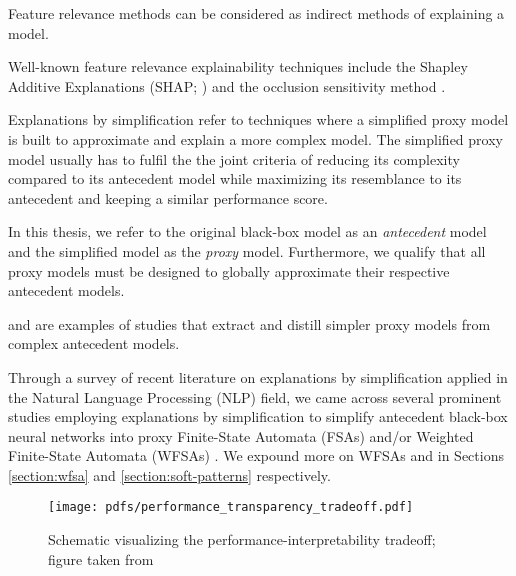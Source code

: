 \begin{remark}
  Feature relevance methods can be considered as indirect methods of explaining a model. 
\end{remark}

\begin{remark}
  Well-known feature relevance explainability techniques include the Shapley Additive Explanations (SHAP; \citealt{lundberg2017unified}) and the occlusion sensitivity method \citep{zeiler2014visualizing}.
\end{remark}

\begin{definition}
  Explanations by simplification refer to techniques where a simplified proxy model is built to approximate and explain a more complex model. The simplified proxy model usually has to fulfil the the joint criteria of reducing its complexity compared to its antecedent model while maximizing its resemblance to its antecedent and keeping a similar performance score.
\end{definition}

\begin{remark}
  In this thesis, we refer to the original black-box model as an \textit{antecedent} model and the simplified model as the \textit{proxy} model. Furthermore, we qualify that all proxy models must be designed to globally approximate their respective antecedent models.
\end{remark}

\begin{remark}
  \citet{bastani2017interpretability} and \citet{tan2018distill} are examples of studies that extract and distill simpler proxy models from complex antecedent models.
\end{remark}

Through a survey of recent literature on explanations by simplification applied in the Natural Language Processing (NLP) field, we came across several prominent studies employing explanations by simplification to simplify antecedent black-box neural networks into proxy Finite-State Automata (FSAs) and/or Weighted Finite-State Automata (WFSAs) \citep{schwartz2018sopa,peng2018rational,DBLP:journals/corr/abs-1905-08701,wang2019state,jiang2020cold}. We expound more on WFSAs and \citet{schwartz2018sopa} in Sections \ref{section:wfsa} and \ref{section:soft-patterns} respectively.

\begin{figure}[t]
  \centering
  \texttt{[image: pdfs/performance\_transparency\_tradeoff.pdf]}
  \caption{Schematic visualizing the performance-interpretability tradeoff; figure taken from \citet{arrieta2020explainable}}
  \label{fig:performance_interpretability_tradeoff}
\end{figure}

